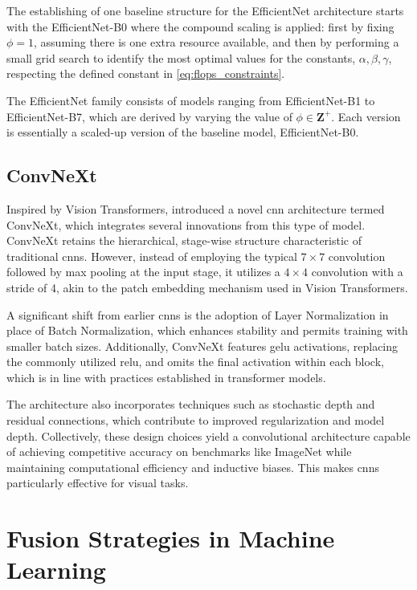 The establishing of one baseline structure for the EfficientNet architecture starts with the EfficientNet-B0 where the compound scaling is applied: first by fixing $\phi = 1$, assuming there is one extra resource available, and then by performing a small grid search to identify the most optimal values for the constants, $\alpha, \beta, \gamma$, respecting the defined constant in \ref{eq:flops_constraints}.

The EfficientNet family consists of models ranging from EfficientNet-B1 to EfficientNet-B7, which are derived by varying the value of \(\phi \in \mathbf{Z^+}\). Each version is essentially a scaled-up version of the baseline model, EfficientNet-B0.



\subsection{ConvNeXt}
Inspired by Vision Transformers, \textcite{liu_convnet_2022} introduced a novel \ac{cnn} architecture termed ConvNeXt, which integrates several innovations from this type of model. ConvNeXt retains the hierarchical, stage-wise structure characteristic of traditional \ac{cnn}s. However, instead of employing the typical $7\times7$ convolution followed by max pooling at the input stage, it utilizes a $4\times4$ convolution with a stride of 4, akin to the patch embedding mechanism used in Vision Transformers.

A significant shift from earlier \acp{cnn} is the adoption of Layer Normalization in place of Batch Normalization, which enhances stability and permits training with smaller batch sizes. Additionally, ConvNeXt features \ac{gelu} activations, replacing the commonly utilized \ac{relu}, and omits the final activation within each block, which is in line with practices established in transformer models.

The architecture also incorporates techniques such as stochastic depth and residual connections, which contribute to improved regularization and model depth. Collectively, these design choices yield a convolutional architecture capable of achieving competitive accuracy on benchmarks like ImageNet while maintaining computational efficiency and inductive biases. This makes \acp{cnn} particularly effective for visual tasks.

\section{Fusion Strategies in Machine Learning}

